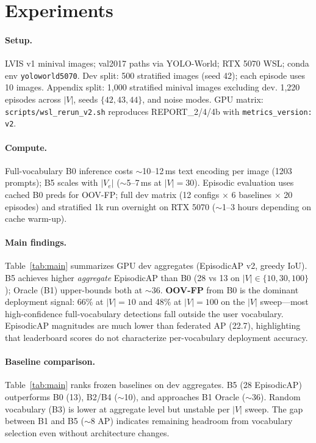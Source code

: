 \documentclass[10pt,twocolumn,letterpaper]{article}
\begin{document}
\section{Experiments}
\label{sec:exp}

\paragraph{Setup.} LVIS v1 minival images; val2017 paths via YOLO-World; RTX 5070 WSL; conda env \texttt{yoloworld5070}.
Dev split: 500 stratified images (seed 42); each episode uses 10 images.
Appendix split: 1,000 stratified minival images excluding dev.
1,220 episodes across $|V|$, seeds $\{42,43,44\}$, and noise modes.
GPU matrix: \texttt{scripts/wsl\_rerun\_v2.sh} reproduces REPORT\_2/4/4b with \texttt{metrics\_version: v2}.

\paragraph{Compute.}
Full-vocabulary B0 inference costs $\sim$10--12\,ms text encoding per image (1203 prompts); B5 scales with $|V_e|$ ($\sim$5--7\,ms at $|V|{=}30$).
Episodic evaluation uses cached B0 preds for OOV-FP; full dev matrix (12 configs $\times$ 6 baselines $\times$ 20 episodes) and stratified 1k run overnight on RTX 5070 ($\sim$1--3 hours depending on cache warm-up).

\paragraph{Main findings.} Table~\ref{tab:main} summarizes GPU dev aggregates (EpisodicAP v2, greedy IoU).
B5 achieves higher \emph{aggregate} EpisodicAP than B0 (28 vs 13 on $|V|{\in}\{10,30,100\}$); Oracle (B1) upper-bounds both at $\sim$36.
\textbf{OOV-FP} from B0 is the dominant deployment signal: 66\% at $|V|{=}10$ and 48\% at $|V|{=}100$ on the $|V|$ sweep---most high-confidence full-vocabulary detections fall outside the user vocabulary.
EpisodicAP magnitudes are much lower than federated AP (22.7), highlighting that leaderboard scores do not characterize per-vocabulary deployment accuracy.

\begin{table}[t]
\centering
\small

\caption{Dev aggregate (GPU, EpisodicAP v2). OOV-FP computed from B0 predictions vs episode $V_e$.}
\label{tab:main}
\end{table}

\paragraph{Baseline comparison.}
Table~\ref{tab:main} ranks frozen baselines on dev aggregates.
B5 (28 EpisodicAP) outperforms B0 (13), B2/B4 ($\sim$10), and approaches B1 Oracle ($\sim$36).
Random vocabulary (B3) is lower at aggregate level but unstable per $|V|$ sweep.
The gap between B1 and B5 ($\sim$8 AP) indicates remaining headroom from vocabulary selection even without architecture changes.
\end{document}
